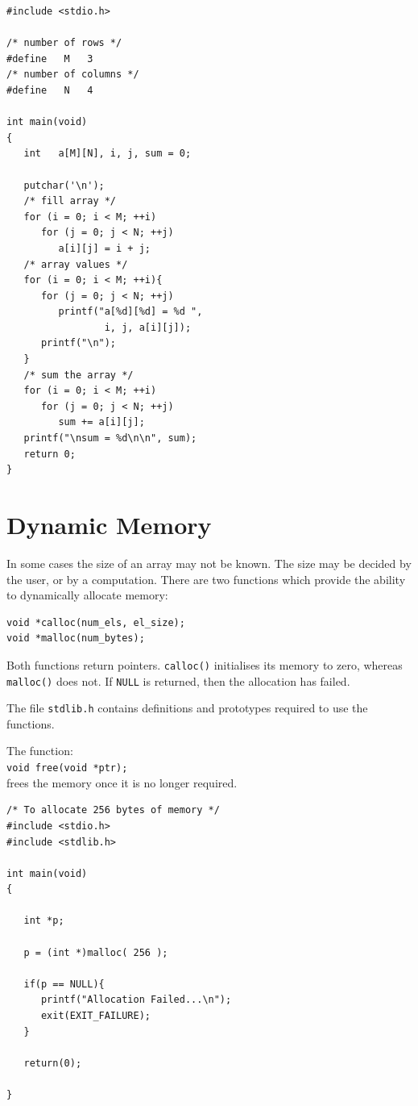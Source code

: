 \documentclass[a4,portraitt]{slides}
\begin{document}
\newpage
\begin{verbatim}
#include <stdio.h>

/* number of rows */
#define   M   3
/* number of columns */
#define   N   4

int main(void)
{
   int   a[M][N], i, j, sum = 0;

   putchar('\n');
   /* fill array */
   for (i = 0; i < M; ++i)
      for (j = 0; j < N; ++j)
         a[i][j] = i + j;
   /* array values */
   for (i = 0; i < M; ++i){
      for (j = 0; j < N; ++j)
         printf("a[%d][%d] = %d ",
                 i, j, a[i][j]);
      printf("\n");
   }
   /* sum the array */
   for (i = 0; i < M; ++i)
      for (j = 0; j < N; ++j)
         sum += a[i][j];
   printf("\nsum = %d\n\n", sum);
   return 0;
}
\end{verbatim}

\newpage
\section*{Dynamic Memory}
In some cases the size of an array may not be known.
The size may be decided by the user, or by a computation.
There are two functions which provide the ability to
dynamically allocate memory:
\begin{verbatim}
void *calloc(num_els, el_size);
void *malloc(num_bytes);
\end{verbatim}
Both functions return pointers.
\verb^calloc()^ initialises its memory to
zero, whereas \verb^malloc()^ does not.
If \verb^NULL^ is returned, then the allocation
has failed.

The file \verb^stdlib.h^ contains definitions and prototypes
required to use the functions.

The function:\\
\verb^void free(void *ptr);^\\
frees the memory once it is no longer required.

\newpage
\begin{verbatim}
/* To allocate 256 bytes of memory */
#include <stdio.h>
#include <stdlib.h>

int main(void)
{

   int *p;

   p = (int *)malloc( 256 );

   if(p == NULL){
      printf("Allocation Failed...\n");
      exit(EXIT_FAILURE);
   }

   return(0);

}
\end{verbatim}
\end{document}
